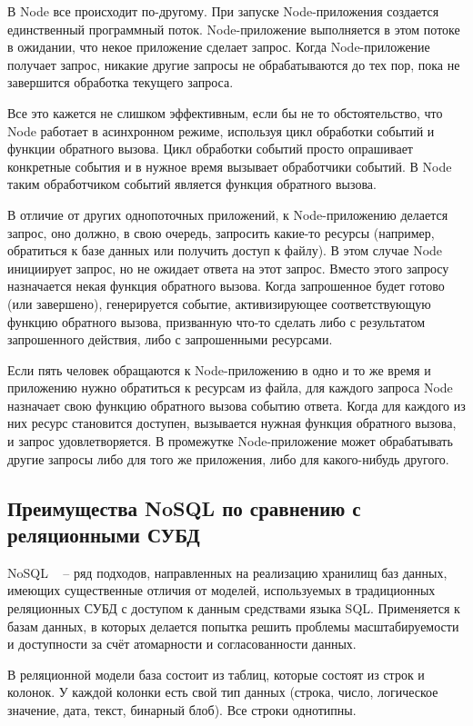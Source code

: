 В Node все происходит по-другому. При запуске Node-приложения создается единственный программный поток. Node-приложение выполняется в этом потоке в ожидании, что некое приложение сделает запрос. Когда Node-приложение получает запрос, никакие другие запросы не обрабатываются до тех пор, пока не завершится обработка текущего запроса.

Все это кажется не слишком эффективным, если бы не то обстоятельство, что Node работает в асинхронном режиме, используя цикл обработки событий и функции обратного вызова. Цикл обработки событий просто опрашивает конкретные события и в нужное время вызывает обработчики событий. В Node таким обработчиком событий является функция обратного вызова.

В отличие от других однопоточных приложений, к Node-приложению делается запрос, оно должно, в свою очередь, запросить какие-то ресурсы (например, обратиться к базе данных или получить доступ к файлу). В этом случае Node инициирует запрос, но не ожидает ответа на этот запрос. Вместо этого запросу назначается некая функция обратного вызова. Когда запрошенное будет готово (или завершено), генерируется событие, активизирующее соответствующую функцию обратного вызова, призванную что-то сделать либо с результатом запрошенного действия, либо с запрошенными ресурсами.

Если пять человек обращаются к Node-приложению в одно и то же время и приложению нужно обратиться к ресурсам из файла, для каждого запроса Node назначает свою функцию обратного вызова событию ответа. Когда для каждого из них ресурс становится доступен, вызывается нужная функция обратного вызова, и запрос удовлетворяется. В промежутке Node-приложение может обрабатывать другие запросы либо для того же приложения, либо для какого-нибудь  другого.



\subsection{Преимущества NoSQL по сравнению с реляционными СУБД}
\label{sub:domain:k2_algo}
NoSQL ~\cite{nosql} -- ряд подходов, направленных на реализацию хранилищ баз данных, имеющих существенные отличия от моделей, используемых в традиционных реляционных СУБД с доступом к данным средствами языка SQL. Применяется к базам данных, в которых делается попытка решить проблемы масштабируемости и доступности за счёт атомарности и согласованности данных.

В реляционной модели база состоит из таблиц, которые состоят из строк и колонок. У каждой колонки есть свой тип данных (строка, число, логическое значение, дата, текст, бинарный блоб). Все строки однотипны.


